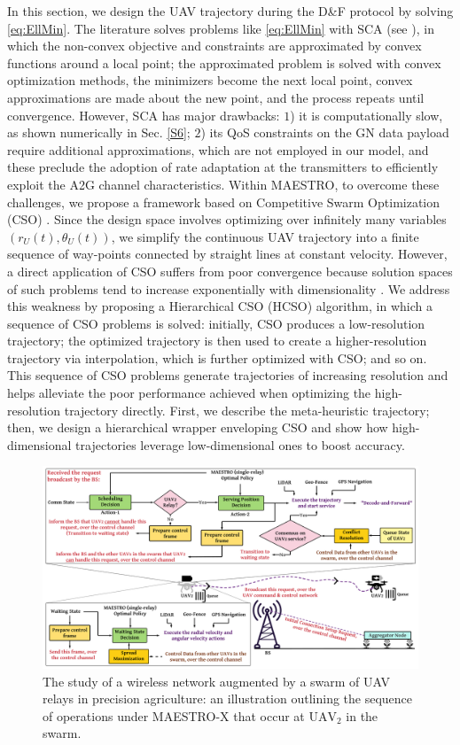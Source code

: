 \documentclass[10pt, twocolumn]{IEEEtran}
\theoremstyle{plain}
\theoremstyle{definition}
\theoremstyle{remark}
\begin{document}
In this section, we design the UAV trajectory during the D\&F protocol by solving \eqref{eq:EllMin}. The literature solves problems like \eqref{eq:EllMin} with SCA (see \cite{SCA, CSCA-ADMM, EnergyEfficientUAVs}), in which the non-convex objective and constraints are approximated by convex functions around a local point; the approximated problem is solved with convex optimization methods, the minimizers become the next local point, convex approximations are made about the new point, and the process repeats until convergence. However, SCA has major drawbacks: $1$) it is computationally slow, as shown numerically in Sec. \ref{S6}; $2$) its QoS constraints on the GN data payload require additional approximations, which are not employed in our model, and these preclude the adoption of rate adaptation at the transmitters to efficiently exploit the A2G channel characteristics. Within MAESTRO, to overcome these challenges, we propose a framework based on Competitive Swarm Optimization (CSO) \cite{CSO}. Since the design space involves optimizing over infinitely many variables $(r_{U}(t),\theta_{U}(t))$, we simplify the continuous UAV trajectory into a finite sequence of way-points connected by straight lines at constant velocity. However, a direct application of CSO suffers from poor convergence because solution spaces of such problems tend to increase exponentially with dimensionality \cite{HighDimensionality}. We address this weakness by proposing a Hierarchical CSO (HCSO) algorithm, in which a sequence of CSO problems is solved: initially, CSO produces a low-resolution trajectory; the optimized trajectory is then used to create a higher-resolution trajectory via interpolation, which is further optimized with CSO; and so on. This sequence of CSO problems generate trajectories of increasing resolution and helps alleviate the poor performance achieved when optimizing the high-resolution trajectory directly. First, we describe the meta-heuristic trajectory; then, we design a hierarchical wrapper enveloping CSO and show how high-dimensional trajectories leverage low-dimensional ones to boost accuracy.
\begin{figure} [t]
    \centering
    \includegraphics[width=0.8\linewidth]{figs/Sequence_of_Operations.png}
    \caption{The study of a wireless network augmented by a swarm of UAV relays in precision agriculture: an illustration outlining the sequence of operations under MAESTRO-X that occur at $\text{UAV}_{2}$ in the swarm.}
    \vspace{-6mm}
    \label{F5}
\end{figure}
\end{document}
